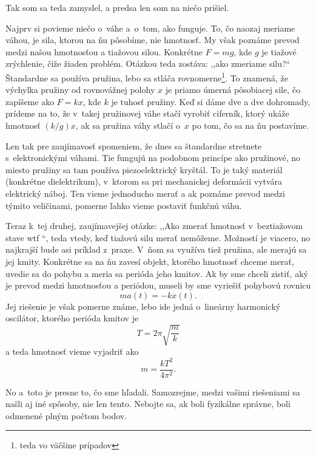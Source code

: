 Tak som sa teda zamyslel, a predsa len som na niečo prišiel.

Najprv si povieme niečo o~váhe a~o~tom, ako funguje.
To, čo naozaj meriame váhou, je sila, ktorou na ňu pôsobíme, nie hmotnosť.
My však poznáme prevod medzi našou hmotnosťou a tiažovou silou.
Konkrétne $F = mg$, kde $g$ je tiažové zrýchlenie, čiže žiaden problém.
Otázkou teda zostáva: ,,ako zmeriame silu?``
Štandardne sa používa pružina, lebo sa stláča rovnomerne\footnote{teda vo väčšine prípadov}.
To znamená, že výchylka pružiny od rovnovážnej polohy $x$ je priamo úmerná pôsobiacej sile, čo zapíšeme ako
$F = k x$, kde $k$ je tuhosť pružiny. Keď si dáme dve a dve dohromady, prídeme na to, že 
v~takej pružinovej váhe stačí vyrobiť ciferník, ktorý ukáže hmotnosť $(k/g)x$,
ak sa pružina váhy stlačí o~$x$ po tom, čo sa na ňu postavíme.

Len tak pre zaujímavosť spomeniem, že dnes sa štandardne stretnete s~elektronickými váhami.
Tie fungujú na podobnom princípe ako pružinové, no miesto pružiny sa tam používa piezoelektrický kryštál.
To je taký materiál (konkrétne dielektrikum), v~ktorom sa pri mechanickej deformácii vytvára elektrický náboj.
Ten vieme jednoducho merať a ak poznáme prevod medzi týmito veličinami, pomerne ľahko vieme postaviť funkčnú váhu.

Teraz k~tej druhej, zaujímavejšej otázke: ,,Ako zmerať hmotnosť v~beztiažovom stave wtf ``,
teda vtedy, keď tiažovú silu merať nemôžeme.
Možností je viacero, no najkrajší bude asi príklad z~praxe. V~ňom sa využíva tiež pružina, ale merajú sa jej kmity.
Konkrétne sa na ňu zavesí objekt, ktorého hmotnosť chceme merať, uvedie sa do pohybu a meria sa 
perióda jeho kmitov. Ak by sme chceli zistiť, aký je prevod medzi hmotnosťou a periódou,
museli by sme vyriešiť pohybovú rovnicu
$$m a(t) = -k x(t)\text{.}$$ 
Jej riešenie je však pomerne známe, lebo ide jedná o~lineárny harmonický oscilátor,
ktorého perióda kmitov je
$$T = 2 \pi \sqrt{\frac{m}{k}}$$
a teda hmotnosť vieme vyjadriť ako
$$m = \dfrac{kT^2}{4 \pi^2}\text{.}$$

No a~toto je presne to, čo sme hľadali. Samozrejme, medzi vašimi riešeniami sa našli aj iné spôsoby, nie len tento.
Nebojte sa, ak boli fyzikálne správne, boli odmenené plným počtom bodov.
